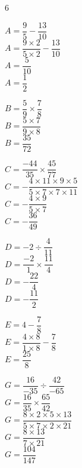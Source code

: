 \documentclass[a4paper]{book}
\begin{document}
{\begin{exerciceNote}{6}
        \begin{minipage}{0.24\linewidth}
            $A = \dfrac{9}{5} - \dfrac{13}{10}$\\[2ex]
            $A=\dfrac{9\times2}{5\times2}-\dfrac{13}{10}$\\[2ex]
            $A=\dfrac{5}{10}$\\[2ex]
            $A=\dfrac{1}{2}$
        \end{minipage}
        \hfill\vline\hfill
        \begin{minipage}{0.24\linewidth}
            $B = \dfrac{5}{9}\times\dfrac{7}{8}$\\[2ex]
            $B = \dfrac{5\times7}{9\times8}$\\[2ex]
            $B = \dfrac{35}{72}$
        \end{minipage}        
        \hfill\vline\hfill
        \begin{minipage}{0.24\linewidth}
            $C = \dfrac{-44}{35} \times \dfrac{45}{77}$\\[2ex]
            $C = -\dfrac{4\times11\times9\times5}{5\times7\times7\times11}$\\[2ex]
            $C = -\dfrac{4\times9}{5\times7}$\\[2ex]
            $C = - \dfrac{36}{49}$
        \end{minipage}
        \hfill\vline\hfill
        \begin{minipage}{0.24\linewidth}
            $D = -2 \div \dfrac{4}{11}$\\[2ex]
            $D=\dfrac{-2}{1}\times\dfrac{11}{4}$\\[2ex]
            $D=-\dfrac{22}{4}$\\[2ex]
            $D=-\dfrac{11}{2}$
        \end{minipage}

        \vspace{1cm}

        \begin{minipage}{0.45\linewidth}
            $E = 4 - \dfrac{7}{8}$\\[2ex]
            $E = \dfrac{4\times8}{1\times8} - \dfrac{7}{8}$\\[2ex]
            $E=\dfrac{25}{8}$
        \end{minipage}
        \hfill\vline\hfill
        \begin{minipage}{0.45\linewidth}
            $G = \dfrac{16}{-35}\div\dfrac{42}{-65}$\\[2ex]
            $G = \dfrac{16}{35}\times\dfrac{65}{42}$\\[2ex]
            $G = \dfrac{8\times2\times5\times13}{5\times7\times2\times21}$\\[2ex]
            $G = \dfrac{8\times13}{7\times21}$\\[2ex]
            $G = \dfrac{104}{147}$
        \end{minipage}        
    \end{exerciceNote}

}
\end{document}
